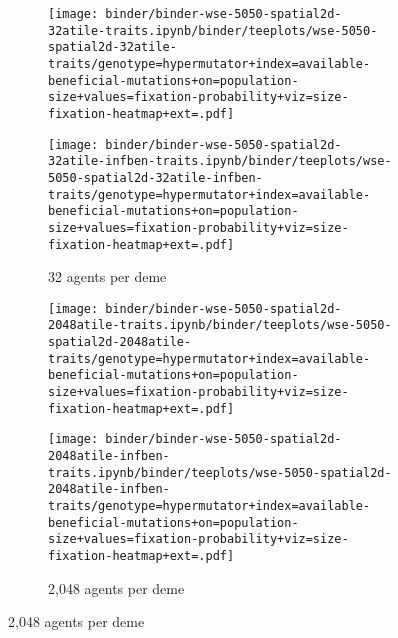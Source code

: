 \begin{figure}[h]
    \begin{subfigure}[b]{\linewidth}
        \begin{minipage}{0.5\linewidth}
          \texttt{[image: binder/binder-wse-5050-spatial2d-32atile-traits.ipynb/binder/teeplots/wse-5050-spatial2d-32atile-traits/genotype=hypermutator+index=available-beneficial-mutations+on=population-size+values=fixation-probability+viz=size-fixation-heatmap+ext=.pdf]}%
        \end{minipage}
        \begin{minipage}{0.5\linewidth}
          \texttt{[image: binder/binder-wse-5050-spatial2d-32atile-infben-traits.ipynb/binder/teeplots/wse-5050-spatial2d-32atile-infben-traits/genotype=hypermutator+index=available-beneficial-mutations+on=population-size+values=fixation-probability+viz=size-fixation-heatmap+ext=.pdf]}%
        \end{minipage}

        \caption{32 agents per deme}
        \label{fig:fixheat-wse-altatile:32}

    \end{subfigure}

\begin{subfigure}[b]{\linewidth}
    \begin{minipage}{0.5\linewidth}
          \texttt{[image: binder/binder-wse-5050-spatial2d-2048atile-traits.ipynb/binder/teeplots/wse-5050-spatial2d-2048atile-traits/genotype=hypermutator+index=available-beneficial-mutations+on=population-size+values=fixation-probability+viz=size-fixation-heatmap+ext=.pdf]}%
    \end{minipage}%
    \begin{minipage}{0.5\linewidth}
          \texttt{[image: binder/binder-wse-5050-spatial2d-2048atile-infben-traits.ipynb/binder/teeplots/wse-5050-spatial2d-2048atile-infben-traits/genotype=hypermutator+index=available-beneficial-mutations+on=population-size+values=fixation-probability+viz=size-fixation-heatmap+ext=.pdf]}%
    \end{minipage}

\caption{2,048 agents per deme}
\label{fig:fixheat-wse-altatile:2048}
\end{subfigure}


\end{figure}
